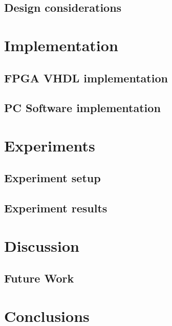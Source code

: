 \documentclass[singleside,openright]{uva-bachelor-thesis}
\begin{document}
\section{Design considerations}


\chapter{Implementation}
\section{FPGA VHDL implementation}
\section{PC Software implementation}

\chapter{Experiments}
\section{Experiment setup}
\section{Experiment results}

\chapter{Discussion}
\section{Future Work}

\chapter{Conclusions}
\end{document}
